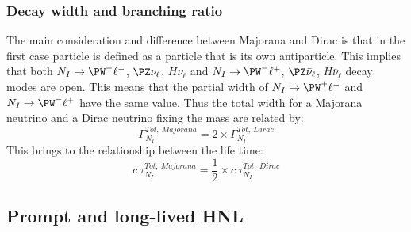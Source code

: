 \subsubsection{Decay width and branching ratio}\label{sec:decay_width}
The main consideration and difference between Majorana and Dirac is that in the first case \hnl particle is defined as a particle that is its own antiparticle. This implies that both $N_I\rightarrow \PW^{+}\ell^-$, $\PZ\nu_{\ell}$, $H\nu_{\ell}$ and $N_I\rightarrow \PW^{-}\ell^+$, $\PZ\bar{\nu}_{\ell}$, $H\bar{\nu}_{\ell}$ decay modes are open. This means that the partial width of $N_I\rightarrow \PW^{+}\ell^-$ and $N_I\rightarrow \PW^{-}\ell^+$ have the same value. Thus the total width for a Majorana neutrino and a Dirac neutrino fixing the mass are related by:
\begin{equation}
\label{eq:width}
\Gamma^{Tot, \: Majorana}_{N_{I}} = 2 \times \Gamma^{Tot, \: Dirac}_{N_{I}}
\end{equation}
This brings to the relationship between the life time:
\begin{equation}
\label{eq:lifetime}
c\:\tau^{Tot, \: Majorana}_{N_{I}} = \frac{1}{2} \times c\:\tau^{Tot, \: Dirac}_{N_{I}}
\end{equation}

\subsection{Prompt and long-lived HNL}\label{sec:promptll}

